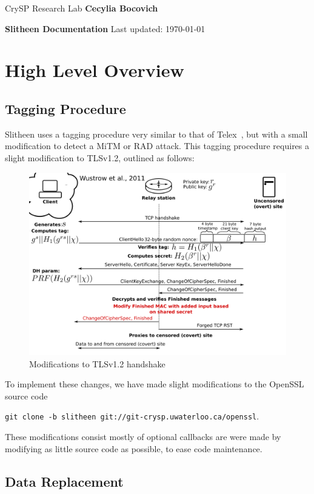 \documentclass[11pt]{article}
\theoremstyle{definittion}
\begin{document}
\noindent
{\sffamily  CrySP Research Lab \hfill \bf\sffamily  Cecylia Bocovich}

\bigskip\medskip

\centerline{{\large\bf\sffamily Slitheen Documentation}  \hfill  Last updated: \today}

\section{High Level Overview}


\subsection{Tagging Procedure}

Slitheen uses a tagging procedure very similar to that of Telex~\cite{wustrow2011}, but with a small modification to detect a MiTM or RAD attack. This tagging procedure requires a slight modification to TLSv1.2, outlined as follows:

\begin{figure}[h]
\centering
\includegraphics[width=.75\textwidth]{tlsmods}
\caption{Modifications to TLSv1.2 handshake}
\end{figure}

To implement these changes, we have made slight modifications to the OpenSSL source code

\texttt{git clone -b slitheen git://git-crysp.uwaterloo.ca/openssl}.

These modifications consist mostly of optional callbacks are were made by modifying as little source code as possible, to ease code maintenance.

\subsection{Data Replacement}
\end{document}
